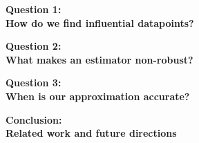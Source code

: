 \documentclass[10pt]{beamer}
\begin{document}


\begin{frame}{}

{\Large \textbf{Question 1:} \\ \vspace{0.5em}
\textbf{How do we find influential datapoints?}}

\end{frame}



\begin{frame}{}

{\Large \textbf{Question 2:} \\ \vspace{0.5em}
\textbf{What makes an estimator non-robust?}}

\end{frame}



\begin{frame}{}

{\Large \textbf{Question 3:} \\ \vspace{0.5em}
\textbf{When is our approximation accurate?}}

\end{frame}



\begin{frame}{}

{\Large \textbf{Conclusion: \\Related work and future directions} }

\end{frame}


\end{document}
